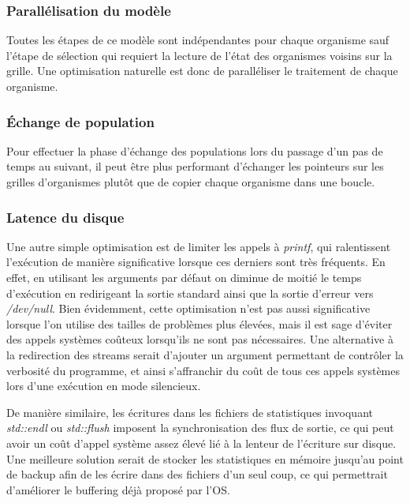 \documentclass[a4paper, 10pt, twoside]{article}
\begin{document}
\subsubsection*{Parallélisation du modèle}

Toutes les étapes de ce modèle sont indépendantes pour chaque organisme sauf l'étape de sélection qui requiert la lecture de l'état des organismes voisins sur la grille. Une optimisation naturelle est donc de paralléliser le traitement de chaque organisme\label{parallel/orga}.

\subsubsection*{Échange de population}

Pour effectuer la phase d'échange des populations lors du passage d'un pas de temps au suivant, il peut être plus performant d'échanger les pointeurs sur les grilles d'organismes plutôt que de copier chaque organisme dans une boucle.

\subsubsection*{Latence du disque}

Une autre simple optimisation est de limiter les appels à \textit{printf}, qui ralentissent l'exécution de manière significative lorsque ces derniers sont très fréquents. En effet, en utilisant les arguments par défaut on diminue de moitié le temps d'exécution en redirigeant la sortie standard ainsi que la sortie d'erreur vers \textit{/dev/null}. Bien évidemment, cette optimisation n'est pas aussi significative lorsque l'on utilise des tailles de problèmes plus élevées, mais il est sage d'éviter des appels systèmes coûteux lorsqu'ils ne sont pas nécessaires. Une alternative à la redirection des streams serait d'ajouter un argument permettant de contrôler la verbosité du programme, et ainsi s'affranchir du coût de tous ces appels systèmes lors d'une exécution en mode silencieux.

De manière similaire, les écritures dans les fichiers de statistiques invoquant \textit{std::endl} ou \textit{std::flush} imposent la synchronisation des flux de sortie, ce qui peut avoir un coût d'appel système assez élevé lié à la lenteur de l'écriture sur disque. Une meilleure solution serait de stocker les statistiques en mémoire jusqu'au point de backup afin de les écrire dans des fichiers d'un seul coup, ce qui permettrait d'améliorer le buffering déjà proposé par l'OS.
\end{document}
